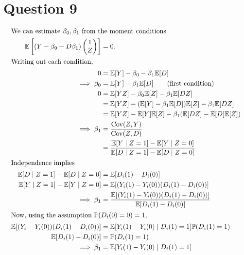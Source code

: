 \documentclass[11pt]{article}
\newcommand{\p}{\mathbb{P}}
\newcommand{\E}{\mathbb{E}}
\newcommand{\Z}{\mathbb{Z}}
\newcommand{\cov}{\operatorname{Cov}}
\begin{document}
\section{Question 9}
\label{sec:org3d1507d}
  \begin{align*}
\intertext{We can estimate $\beta_0, \beta_1$ from the moment conditions}
\E\left[(Y - \beta_0 - D\beta_1)\begin{pmatrix}1\\Z\end{pmatrix}\right] &= 0.\\
\intertext{Writing out each condition,}
0 &= \E[Y] - \beta_0 - \beta_1 \E[D]\\
\implies \beta_0 &= \E[Y] - \beta_1 \E[D] \tag{first condition}\\
0 &= \E[YZ] - \beta_0\E[Z] - \beta_1\E[DZ]\\
&= \E[YZ] - (\E[Y] - \beta_1 \E[D]) \E[Z] - \beta_1 \E[DZ]\\
&= \E[YZ] - \E[Y]\E[Z] - \beta_1 (\E[DZ] - \E[D]\E[Z])\\
\implies \beta_1 &= \frac{\cov (Z, Y)}{\cov (Z, D)}\\
&= \frac{\E[Y \mid Z = 1] - \E[Y \mid Z = 0]}{\E[D \mid Z = 1] - \E[D \mid Z = 0]}\\
 \intertext{Independence implies}
 \E[D \mid Z = 1] - \E[D \mid Z = 0] &= \E[D_i(1) - D_i(0)]\\
 \E[Y \mid Z = 1] - \E[Y \mid Z = 0] &= \E[(Y_i(1) - Y_i(0))(D_i(1) - D_i(0))]\\
 \implies \beta_1 &= \frac{\E[(Y_i(1) - Y_i(0))(D_i(1) - D_i(0))]}{\E[D_i(1) - D_i(0)]}\\
 \intertext{Now, using the assumption $\p(D_i(0) = 0) = 1$,}
 \E[(Y_i - Y_i(0))(D_i(1) - D_i(0))] &= \E[Y_i(1) - Y_i(0) \mid D_i(1) = 1]\p(D_i(1) = 1)\\
 \E[D_i(1) - D_i(0)] &= \p (D_i(1) = 1)\\
 \implies \beta_1 &= \E[Y_i (1) - Y_i(0) \mid D_i(1) = 1]
  \end{align*}
\end{document}
